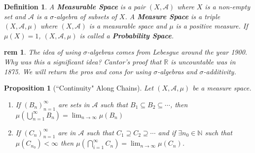 \documentclass[letterpaper, 12pt]{article}
\newcommand{\fin}{\qquad \quad \hfill \framebox[1.75mm][l]{\,}}
\newcommand{\bR}{\mathbb{R}}
\newcommand{\bN}{\mathbb{N}}
\newcommand{\sA}{\mathcal{A}}
\theoremstyle{stdthm}
\newtheorem{prop}[thm]{Proposition}
\theoremstyle{stddef}
\newtheorem{defn}[thm]{Definition}
\newtheorem{rem}[thm]{rem} %
\theoremstyle{stdnonum}
\theoremstyle{stdqands}
\theoremstyle{stdbold}
\begin{document}
\begin{defn}
A {\bf Measurable Space} is a pair $(X,\sA)$ where $X$ is a non-empty set and $\sA$ is a $\sigma$-algebra of subsets of $X$. A {\bf Measure Space} is a triple $(X,\sA, \mu)$ where $(X,\sA)$ is a measurable space and $\mu$ is a positive measure. If $\mu(X) = 1$, $(X,\sA,\mu)$ is called a {\bf Probability Space}.
\end{defn}

\begin{rem}
The idea of using $\sigma$-algebras comes from Lebesgue around the year 1900. Why was this a significant idea? Cantor's proof that $\bR$ is uncountable was in 1875. We will return the pros and cons for using $\sigma$-algebras and $\sigma$-additivity. 
\end{rem}

\begin{prop}[``Continuity" Along Chains]

Let $(X,\sA,\mu)$ be a measure space. 
\begin{enumerate}
\item If $(B_n)_{n=1}^\infty$ are sets in $\sA$ such that $B_1 \subseteq B_2 \subseteq \cdots$, then $\mu\left( \bigcup_{n=1}^\infty B_n \right) = \lim_{n\to\infty} \mu(B_n)$
\item If $(C_n)_{n=1}^\infty$ are in $\sA$ such that $C_1 \supseteq C_2\supseteq \cdots$ and if $\exists n_0 \in \bN$ such that $\mu(C_{n_0})<\infty$ then $\mu \left( \bigcap _{i=1}^\infty C_n \right) = \lim_{n\rightarrow \infty} \mu(C_n)$. 
\end{enumerate}
\end{prop}
\end{document}
